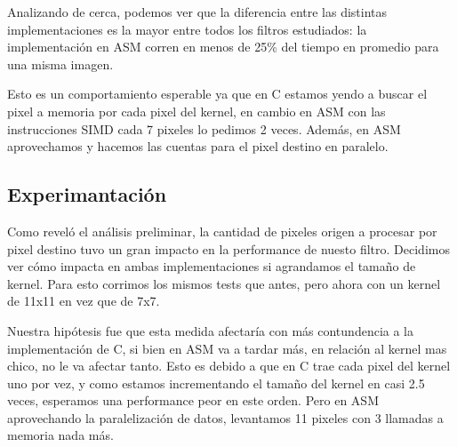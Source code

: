 Analizando de cerca, podemos ver que la diferencia entre las distintas implementaciones es la mayor entre todos los filtros estudiados: la implementación en ASM corren en menos de 25\% del tiempo en promedio para una misma imagen.

Esto es un comportamiento esperable ya que en C estamos yendo a buscar el pixel a memoria por cada pixel del kernel, en cambio en ASM con las instrucciones SIMD cada 7 pixeles lo pedimos 2 veces. Además, en ASM aprovechamos y hacemos las cuentas para el pixel destino en paralelo.

\subsection{Experimantación}
Como reveló el análisis preliminar, la cantidad de pixeles origen a procesar por pixel destino tuvo un gran impacto en la performance de nuesto filtro. Decidimos ver cómo impacta en ambas implementaciones si agrandamos el tamaño de kernel. Para esto corrimos los mismos tests que antes, pero ahora con un kernel de 11x11 en vez que de 7x7.

Nuestra hipótesis fue que esta medida afectaría con más contundencia a la implementación de C, si bien en ASM va a tardar más, en relación al kernel mas chico, no le va afectar tanto. Esto es debido a que en C trae cada pixel del kernel uno por vez, y como estamos incrementando el tamaño del kernel en casi 2.5 veces, esperamos una performance peor en este orden. Pero en ASM aprovechando la paralelización de datos, levantamos 11 pixeles con 3 llamadas a memoria nada más.


